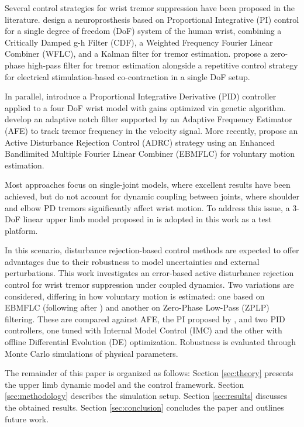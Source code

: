 Several control strategies for wrist tremor suppression have been proposed in the literature. \cite{Gallego:2013} design a neuroprosthesis based on Proportional Integrative (PI) control for a single degree of freedom (DoF) system of the human wrist, combining a Critically Damped g-h Filter (CDF), a Weighted Frequency Fourier Linear Combiner (WFLC), and a Kalman filter for tremor estimation. \cite{Copur:2019} propose a zero-phase high-pass filter for tremor estimation alongside a repetitive control strategy for electrical stimulation-based co-contraction in a single DoF setup.

In parallel, \cite{Lekshmi:2019} introduce a Proportional Integrative Derivative (PID) controller applied to a four DoF wrist model with gains optimized via genetic algorithm. \cite{Zamanian:2019} develop an adaptive notch filter supported by an Adaptive Frequency Estimator (AFE) to track tremor frequency in the velocity signal. More recently, \cite{Qi:2024} propose an Active Disturbance Rejection Control (ADRC) strategy using an Enhanced Bandlimited Multiple Fourier Linear Combiner (EBMFLC) for voluntary motion estimation.

Most approaches focus on single-joint models, where excellent results have been achieved, but do not account for dynamic coupling between joints, where shoulder and elbow PD tremors significantly affect wrist motion. To address this issue, a 3-DoF linear upper limb model proposed in \citep{Gebai:2017, Gebai:2018} is adopted in this work as a test platform.

In this scenario, disturbance rejection-based control methods are expected to offer advantages due to their robustness to model uncertainties and external perturbations. This work investigates an error-based active disturbance rejection control for wrist tremor suppression under coupled dynamics. Two variations are considered, differing in how voluntary motion is estimated: one based on EBMFLC (following after \cite{Qi:2024}) and another on Zero-Phase Low-Pass (ZPLP) filtering. 
These are compared against AFE,  
the PI proposed by \cite{Gallego:2013}, and two PID controllers, one tuned with Internal Model Control (IMC) and the other with offline Differential Evolution (DE) optimization. 
Robustness is evaluated through Monte Carlo simulations of physical parameters.

The remainder of this paper is organized as follows: Section \ref{sec:theory} presents the upper limb dynamic model and the control framework. Section \ref{sec:methodology} describes the simulation setup. Section \ref{sec:results} discusses the obtained results. Section \ref{sec:conclusion} concludes the paper and outlines future work.